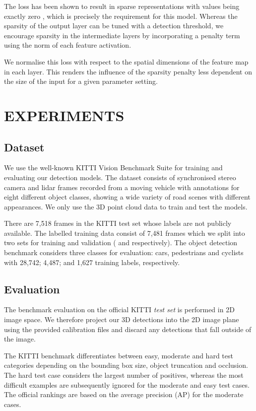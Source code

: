 \documentclass[letterpaper, 10 pt, conference]{tex_style/ieeeconf}
\begin{document}
The  loss has been shown to result in sparse representations with values being exactly zero \cite{murphy2012machine}, which is precisely the requirement for this model.
Whereas the sparsity of the output layer can be tuned with a detection threshold, we encourage sparsity in the intermediate layers by incorporating a penalty term using the  norm of each feature activation.

We normalise this  loss with respect to the spatial dimensions of the feature map in each layer.
This renders the influence of the sparsity penalty less dependent on the size of the input for a given parameter setting. 

\section{EXPERIMENTS}
\label{sec:experiments}


\subsection{Dataset}
We use the well-known KITTI Vision Benchmark Suite \cite{Geiger2012CVPR} for training and evaluating our detection models.
The dataset consists of synchronised stereo camera and lidar frames recorded from a moving vehicle with annotations for eight different object classes, showing a wide variety of road scenes with different appearances.
We only use the 3D point cloud data to train and test the models.

There are 7,518 frames in the KITTI test set whose labels are not publicly available.
The labelled training data consist of 7,481 frames which we split into two sets for training and validation ( and  respectively). 
The object detection benchmark considers three classes for evaluation: cars, pedestrians and cyclists with 28,742; 4,487; and 1,627 training labels, respectively.



\subsection{Evaluation}
The benchmark evaluation on the official KITTI \emph{test set} is performed in 2D image space.
We therefore project our 3D detections into the 2D image plane using the provided calibration files and discard any detections that fall outside of the image.

The KITTI benchmark differentiates between easy, moderate and hard test categories depending on the bounding box size, object truncation and occlusion.
The hard test case considers the largest number of positives, whereas the most difficult examples are subsequently ignored for the moderate and easy test cases.
The official rankings are based on the average precision (AP) for the moderate cases.
\end{document}
